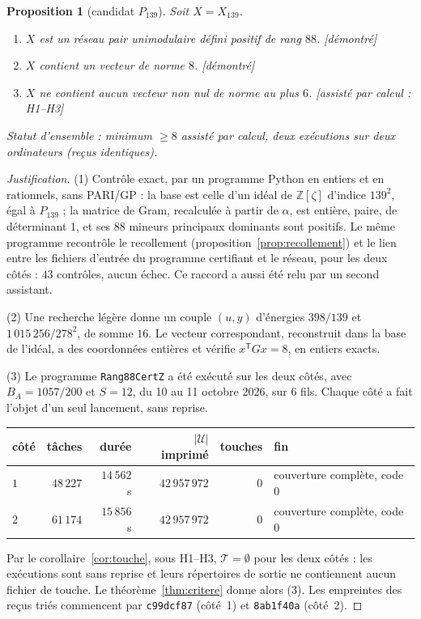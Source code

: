\documentclass[11pt,a4paper]{amsart}
\theoremstyle{plain}
\newtheorem{proposition}[theoreme]{Proposition}
\theoremstyle{definition}
\numberwithin{equation}{section}
\newcommand{\Z}{\mathbb{Z}}
\newcommand{\Uc}{\mathcal{U}}
\newcommand{\Tc}{\mathcal{T}}
\newcommand{\st}[1]{\textup{\textsf{\small[#1]}}}
\newcommand{\DEM}{\st{démontré}}
\begin{document}
\begin{proposition}[candidat $P_{139}$]\label{prop:P139}
Soit $X=X_{139}$.
\begin{enumerate}[label=\textup{(\arabic*)}]
\item $X$ est un réseau pair unimodulaire défini positif de rang $88$. \DEM
\item $X$ contient un vecteur de norme $8$. \DEM
\item $X$ ne contient aucun vecteur non nul de norme au plus $6$. \st{assisté par calcul : H1--H3}
\end{enumerate}
Statut d'ensemble : minimum $\ge8$ assisté par calcul, deux exécutions sur deux ordinateurs (reçus identiques).
\end{proposition}

\begin{proof}[Justification]
(1) Contrôle exact, par un programme Python en entiers et en rationnels, sans PARI/GP : la base est celle d'un idéal de $\Z[\zeta]$ d'indice $139^2$, égal à $P_{139}$ ; la matrice de Gram, recalculée à partir de $\alpha$, est entière, paire, de déterminant $1$, et ses $88$ mineurs principaux dominants sont positifs. Le même programme recontrôle le recollement (proposition~\ref{prop:recollement}) et le lien entre les fichiers d'entrée du programme certifiant et le réseau, pour les deux côtés : $43$ contrôles, aucun échec. Ce raccord a aussi été relu par un second assistant.

(2) Une recherche légère donne un couple $(u,y)$ d'énergies $398/139$ et $1\,015\,256/278^2$, de somme $16$. Le vecteur correspondant, reconstruit dans la base de l'idéal, a des coordonnées entières et vérifie $x^{\mathsf T}Gx=8$, en entiers exacts.

(3) Le programme \texttt{Rang88CertZ} a été exécuté sur les deux côtés, avec $B_A=1057/200$ et $S=12$, du 10 au 11 octobre 2026, sur $6$ fils. Chaque côté a fait l'objet d'un seul lancement, sans reprise.
\begin{center}\small
\begin{tabular}{lrrrrl}
\toprule
côté & tâches & durée & $|\Uc|$ imprimé & touches & fin \\
\midrule
$1$ & $48\,227$ & $14\,562$ s & $42\,957\,972$ & $0$ & couverture complète, code $0$ \\
$2$ & $61\,174$ & $15\,856$ s & $42\,957\,972$ & $0$ & couverture complète, code $0$ \\
\bottomrule
\end{tabular}
\end{center}
Par le corollaire~\ref{cor:touche}, sous H1--H3, $\Tc=\emptyset$ pour les deux côtés : les exécutions sont sans reprise et leurs répertoires de sortie ne contiennent aucun fichier de touche. Le théorème~\ref{thm:critere} donne alors (3). Les empreintes des reçus triés commencent par \texttt{c99dcf87} (côté~1) et \texttt{8ab1f40a} (côté~2).
\end{proof}
\end{document}
